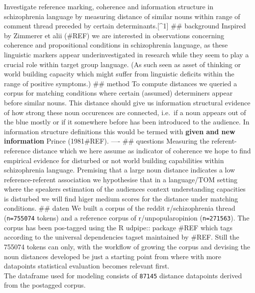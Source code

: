 \documentclass[]{tufte-handout}
\begin{document}
Investigate reference marking, coherence and information structure in
schizophrenia language by measuring distance of similar nouns within
range of comment thread preceded by certain determinants.{[}\^{}1{]}
\#\# background Inspired by Zimmerer et alii (\#REF) we are interested
in observations concerning coherence and propositional conditions in
schizophrenia language, as these linguistic markers appear
underinvestigated in research while they seem to play a crucial role
within target group language. (As such seen as asset of thinking or
world building capacity which might suffer from linguistic deficits
within the range of positive symptoms.) \#\# method To compute distances
we queried a corpus for matching conditions where certain (assumed)
determiners appear before similar nouns. This distance should give us
information structural evidence of how strong these noun occurences are
connected, i.e.~if a noun appears out of the blue mostly or if it
somewhere before has been introduced to the audience. In information
structure definitions this would be termed with \textbf{given and new
information} Prince (1981\#REF). ---- \#\# questions Measuring the
referent-reference distance which we here assume as indicator of
coherence we hope to find empirical evidence for disturbed or not world
building capabilities within schizophrenia language. Premising that a
large noun distance indicates a low reference-referent association we
hypothesise that in a language/TOM setting where the speakers estimation
of the audiences context understanding capacities is disturbed we will
find higer medium scores for the distance under matching conditions.
\#\# daten We built a corpus of the reddit r/schizophrenia thread
(\texttt{n=755074} tokens) and a reference corpus of r/unpopularopinion
(\texttt{n=271563}). The corpus has been pos-tagged using the R udpipe::
package \#REF which tags according to the universal dependencies tagset
maintained by \#REF. Still the 755074 tokens can only, with the workflow
of growing the corpus and devising the noun distances developed be just
a starting point from where with more datapoints statistical evaluation
becomes relevant first.\\
The dataframe used for modeling consists of \texttt{87145} distance
datapoints derived from the postagged corpus.
\end{document}
